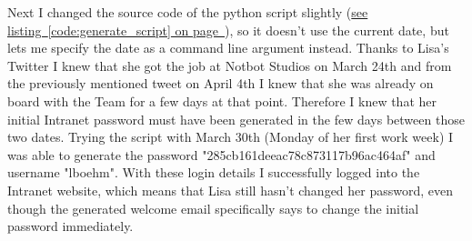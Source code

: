 Next I changed the source code of the python script slightly (\hyperref[code:generate_script]{see listing~\ref*{code:generate_script} on page~\pageref*{code:generate_script}}), so it doesn't use the current date, but lets me specify the date as a command line argument instead. Thanks to Lisa's Twitter I knew that she got the job at Notbot Studios on March 24th and from the previously mentioned tweet on April 4th I knew that she was already on board with the Team for a few days at that point. Therefore I knew that her initial Intranet password must have been generated in the few days between those two dates. Trying the script with March 30th (Monday of her first work week) I was able to generate the password "285cb161deeac78c873117b96ac464af" and username "lboehm". With these login details I successfully logged into the Intranet website, which means that Lisa still hasn't changed her password, even though the generated welcome email specifically says to change the initial password immediately.


